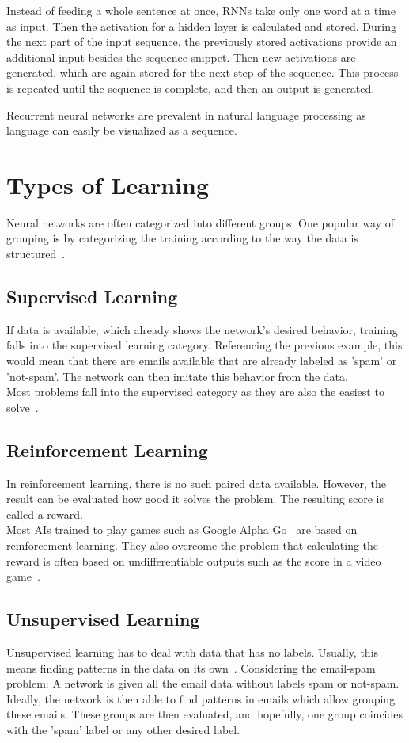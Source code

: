 Instead of feeding a whole sentence at once, RNNs take only one word at a time as input.
Then the activation for a hidden layer is calculated and stored.
During the next part of the input sequence, the previously stored activations provide an additional input besides the sequence snippet.
Then new activations are generated, which are again stored for the next step of the sequence.
This process is repeated until the sequence is complete, and then an output is generated.

Recurrent neural networks are prevalent in natural language processing as language can easily be visualized as a sequence.

\section{Types of Learning}
Neural networks are often categorized into different groups.
One popular way of grouping is by categorizing the training according to the way the data is structured~\cite{grosse, ommer}.

\subsection{Supervised Learning}
If data is available, which already shows the network's desired behavior, training falls into the supervised learning category.
Referencing the previous example, this would mean that there are emails available that are already labeled as 'spam' or 'not-spam'.
The network can then imitate this behavior from the data. \\
Most problems fall into the supervised category as they are also the easiest to solve~\cite{grosse}.

\subsection{Reinforcement Learning}
In reinforcement learning, there is no such paired data available.
However, the result can be evaluated how good it solves the problem.
The resulting score is called a reward.\\
Most AIs trained to play games such as Google Alpha Go~\cite{alphago} are based on reinforcement learning.
They also overcome the problem that calculating the reward is often based on undifferentiable outputs such as the score in a video game~\cite{grosse}.

\subsection{Unsupervised Learning}
Unsupervised learning has to deal with data that has no labels.
Usually, this means finding patterns in the data on its own~\cite{grosse}.
Considering the email-spam problem: A network is given all the email data without labels spam or not-spam.
Ideally, the network is then able to find patterns in emails which allow grouping these emails.
These groups are then evaluated, and hopefully, one group coincides with the 'spam' label or any other desired label.

